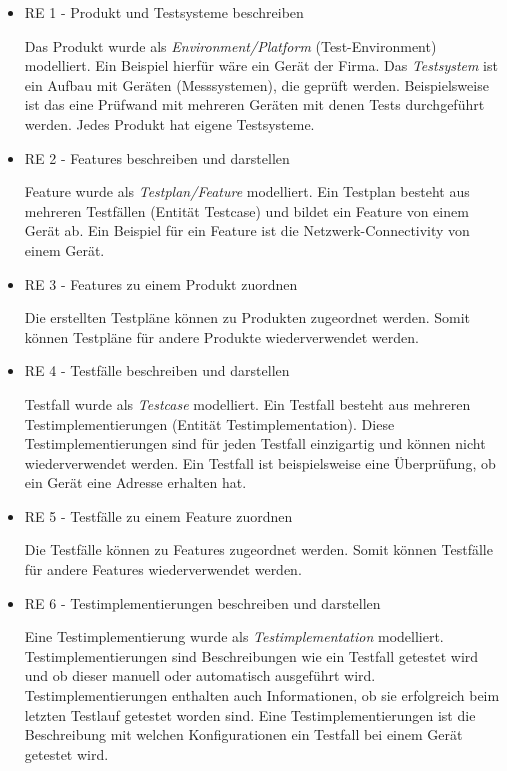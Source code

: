 \documentclass[a4paper, fontsize=11pt, parskip=half, twoside]{scrreprt}
\begin{document}
	\begin{itemize}
		\item RE 1 - Produkt und Testsysteme beschreiben
		
		Das Produkt wurde als \emph{Environment/Platform} (Test-Environment) modelliert.
		Ein Beispiel hierfür wäre ein Gerät der Firma.
		Das \emph{Testsystem} ist ein Aufbau mit Geräten (Messsystemen), die geprüft werden. 
		Beispielsweise ist das eine Prüfwand mit mehreren Geräten mit denen Tests durchgeführt werden.
		Jedes Produkt hat eigene Testsysteme.
		
		\item RE 2 - Features beschreiben und darstellen
		
		Feature wurde als \emph{Testplan/Feature} modelliert.
		Ein Testplan besteht aus mehreren Testfällen (Entität Testcase) und bildet ein Feature von einem Gerät ab.
		Ein Beispiel für ein Feature ist die Netzwerk-Connectivity von einem Gerät.
		
		\item RE 3 - Features zu einem Produkt zuordnen
		
		Die erstellten Testpläne können zu Produkten zugeordnet werden.
		Somit können Testpläne für andere Produkte wiederverwendet werden.
		
		\item RE 4 - Testfälle beschreiben und darstellen
		
		Testfall wurde als \emph{Testcase} modelliert.
	    Ein Testfall besteht aus mehreren Testimplementierungen (Entität Testimplementation).
	    Diese Testimplementierungen sind für jeden Testfall einzigartig und können nicht wiederverwendet werden. 
	    Ein Testfall ist beispielsweise eine Überprüfung, ob ein Gerät eine  Adresse erhalten hat.
		
		\item RE 5 - Testfälle zu einem Feature zuordnen
		
		Die Testfälle können zu Features zugeordnet werden.
		Somit können Testfälle für andere Features wiederverwendet werden.
		
		\item RE 6 - Testimplementierungen beschreiben und darstellen
		
		Eine Testimplementierung wurde als \emph{Testimplementation} modelliert.
		Testimplementierungen sind Beschreibungen wie ein Testfall getestet wird und ob dieser manuell oder automatisch ausgeführt wird.
		Testimplementierungen enthalten auch Informationen, ob sie erfolgreich beim letzten Testlauf getestet worden sind.
		Eine Testimplementierungen ist die Beschreibung mit welchen Konfigurationen ein Testfall bei einem Gerät getestet wird.
		

\end{itemize}
\end{document}
